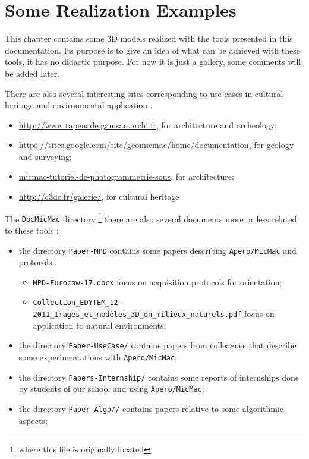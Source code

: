 \chapter{Some Realization Examples}


This chapter contains some 3D models realized with the tools presented
in this documentation. Its purpose is to give an idea of what can be achieved with these tools,
it has no didactic purpose.
For now it is just a gallery, some comments will be added later.

There are also several interesting sites corresponding to use
cases in cultural heritage and environmental application :

\begin{itemize}
   \item \url{http://www.tapenade.gamsau.archi.fr}, for architecture and
         archeology;

   \item \url{https://sites.google.com/site/geomicmac/home/documentation}, for geology and surveying;

   \item \href{http://combiencaporte.blogspot.fr/2013/10/micmac-tutoriel-de-photogrammetrie-sous.html}{micmac-tutoriel-de-photogrammetrie-sous},
         for architecture;

    \item \url{http://c3dc.fr/galerie/}, for cultural heritage
\end{itemize}

The {\tt DocMicMac} directory \footnote{where this file is originally located}
there are also several documents more or less related to these tools :

\begin{itemize}
   \item  the directory {\tt Paper-MPD} contains some papers describing {\tt Apero/MicMac}
          and protocols :

          \begin{itemize}
              \item {\tt MPD-Eurocow-17.docx} focus on acquisition protocols for orientation;
              \item {\tt Collection\_EDYTEM\_12-2011\_Images\_et\_modèles\_3D\_en\_milieux\_naturels.pdf}
                    focus on application to natural environments;
          \end{itemize}

   \item  the directory {\tt Paper-UseCase/} contains papers from colleagues that describe some experimentations with {\tt Apero/MicMac};

   \item  the directory {\tt Papers-Internship/} contains some reports of internships done
          by students of our school and using {\tt Apero/MicMac};

   \item  the directory {\tt Paper-Algo//} contains papers relative to some algorithmic aspects;
\end{itemize}

